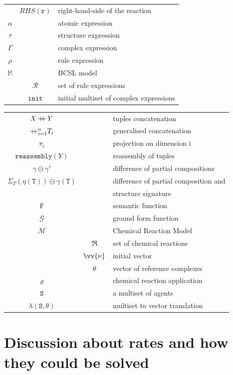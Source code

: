 \documentclass[12pt]{fithesis2}
\newcommand\mdoubleplus{\mathbin{+\mkern-7mu+}}
\begin{document}
\begin{tabular}{c c | l}
 & $RHS(\mathtt{r})$ & right-hand-side of the reaction\\
$\alpha$ & & atomic expression\\
$\tau$ & & structure expression\\
$\Gamma$ & & complex expression\\
$\rho$ & & rule expression\\
$\mathds{M}$ & & BCSL model\\
 & $\mathcal{R}$ & set of rule expressions\\
 & $\mathtt{init}$ & initial multiset of complex expressions\\
\end{tabular}

\begin{tabular}{c c | l}
$X \mdoubleplus Y$ & & tuples concatenation\\
$\mdoubleplus_{i=1}^n T_i$ & & generalised concatenation\\
$\pi_i$ & & projection on dimension i\\
$\mathtt{reassembly}(Y)$ & & reassembly of tuples\\
$\gamma \ominus \gamma'$ & & difference of partial compositions\\
$\Sigma_T(\mathtt{\eta(\mathtt{T})}) \ominus \gamma(\mathtt{T})$ & & difference of partial composition and\\
 & & structure signature\\
$\mathtt{F}$ & & semantic function\\
$\mathcal{G}$ & & ground form function\\
$\mathcal{M}$ & & Chemical Reaction Model\\
 & $\mathfrak{R}$ & set of chemical reactions\\
 & $\vv{\nu}$ & initial vector\\
 & $\theta$ & vector of reference complexes\\
$\varrho$ & & chemical reaction application\\
$\mathtt{S}$ & & a multiset of agents\\
$\lambda(\mathtt{S}, \theta)$ & & multiset to vector translation\\
\end{tabular}

\chapter{Discussion about rates and how they could be solved}
\label{rates_discussion}
\end{document}
